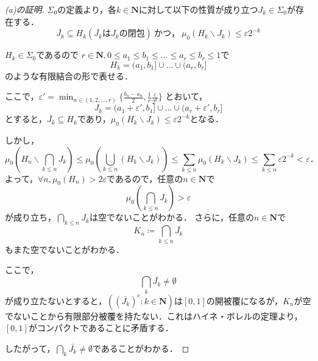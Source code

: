 \documentclass{jsarticle}
\begin{document}
\begin{proof}[\rm (a)の証明]{}
    $\Sigma_0$の定義より，各$k\in\mathbf{N}$に対して以下の性質が成り立つ$J_k\in\Sigma_0$が存在する．
    \begin{equation}
        \bar{J_k}\subseteq H_k(\bar{J_k} は J_k の閉包 )\ かつ，\ \mu_0(H_k\backslash J_k)\leq \varepsilon2^{-k} \nonumber
    \end{equation}
    \begin{itembox}{}
        $H_k\in\Sigma_0$であるので
        $r\in\mathbf{N},0\leq a_1\leq b_1\leq\dots\leq a_r\leq b_r\leq 1$で
        \begin{equation}
            H_k=(a_1,b_1]\cup\dots\cup(a_r,b_r] \nonumber
        \end{equation}
        のような有限結合の形で表せる．
        
        ここで，$\varepsilon'=\min_{n\in(1,2,\dots,r)} \{ \frac{b_n-a_n}{2},\frac{1}{r}\frac{\varepsilon}{2^k} \}$
        とおいて，
        \begin{equation}
            J_k=(a_1+\varepsilon',b_1]\cup\dots\cup(a_r+\varepsilon',b_r] \nonumber
        \end{equation}
        とすると，$\bar{J_k}\subseteq H_k$であり，$\mu_0(H_k\backslash J_k)\leq \varepsilon2^{-k}$となる．
    \end{itembox}
    しかし，
    \begin{equation}
        \mu_0\left( H_n\backslash \bigcap_{k\leq n}J_k \right) \leq \mu_0\left( \bigcup_{k\leq n} (H_k\backslash J_k) \right) \leq \sum_{k\leq n} \mu_0(H_k\backslash J_k) \leq \sum_{k\leq n} \varepsilon2^{-k} < \varepsilon ． \nonumber
    \end{equation}
    よって，$\forall n, \mu_0(H_n)>2\varepsilon$であるので，任意の$n\in\mathbf{N}$で
    \begin{equation}
        \mu_0\left( \bigcap_{k\leq n}J_k \right) >\varepsilon \nonumber
    \end{equation}
    が成り立ち，$\bigcap_{k\leq n}J_k$は空でないことがわかる．
    さらに，任意の$n\in\mathbf{N}$で
    \begin{equation}
        K_n \coloneqq \bigcap_{k\leq n}\bar{J_k} \nonumber
    \end{equation}
    もまた空でないことがわかる．

    ここで，
    \begin{equation}
        \bigcap_{k}\bar{J_k} \neq \emptyset \nonumber
    \end{equation}
    が成り立たないとすると，$((\bar{J_k})^c:k\in\mathbf{N})$は$[0,1]$の開被覆になるが，$K_n$が空でないことから有限部分被覆を持たない．これはハイネ・ボレルの定理より，$[0,1]$がコンパクトであることに矛盾する．
    
    したがって，$\bigcap_{k}\bar{J_k} \neq \emptyset$であることがわかる．
\end{proof}
\end{document}
